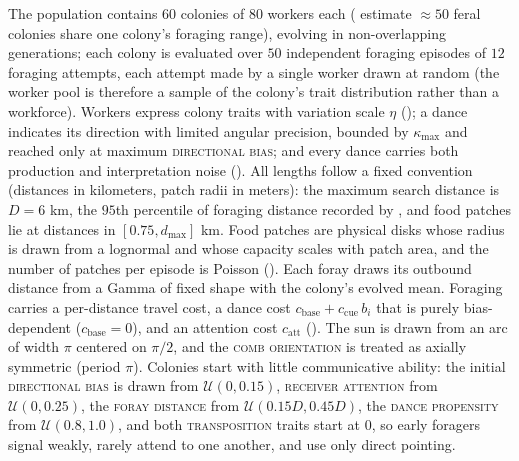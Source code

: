\documentclass[11pt]{article}
\newcommand{\trait}[1]{\textsc{#1}}
\begin{document}
The population contains $60$ colonies of $80$ workers each
(\citealp{visscher1982foraging} estimate $\approx 50$ feral colonies share one
colony's foraging range), evolving in non-overlapping generations; each colony is evaluated over
$50$ independent foraging episodes of $12$ foraging attempts, each attempt made
by a single worker drawn at random (the worker pool is therefore a sample of the
colony's trait distribution rather than a workforce). Workers
express colony traits with variation scale $\eta$ (); a dance
indicates its direction with limited angular precision, bounded by
$\kappa_{\max}$ and reached only at maximum \trait{directional bias}; and every
dance carries both production and interpretation noise ().
All lengths follow a
fixed convention (distances in kilometers, patch radii in meters): the maximum
search distance is $D = 6$ km, the $95$th percentile of foraging distance
recorded by \citet{visscher1982foraging}, and food patches lie at distances in
$[0.75, d_{\max}]$ km. Food patches are physical disks
whose radius is drawn from a lognormal and whose capacity scales with patch area,
and the number of patches per episode is Poisson (). Each foray draws its
outbound distance from a Gamma of fixed shape with the colony's evolved mean.
Foraging carries a per-distance travel cost, a dance cost
$c_{\mathrm{base}} + c_{\mathrm{cue}}\,b_i$ that is purely bias-dependent
($c_{\mathrm{base}} = 0$), and an attention cost $c_{\mathrm{att}}$
(). The sun is drawn from an arc of width $\pi$ centered on
$\pi/2$, and the \trait{comb orientation} is treated as axially symmetric (period $\pi$).
Colonies start with little communicative ability: the initial \trait{directional bias} is
drawn from $\mathcal{U}(0,0.15)$, \trait{receiver attention} from $\mathcal{U}(0,0.25)$,
the \trait{foray distance} from $\mathcal{U}(0.15D, 0.45D)$, the \trait{dance propensity} from
$\mathcal{U}(0.8,1.0)$, and both \trait{transposition} traits start at $0$, so early
foragers signal weakly, rarely attend to one another, and use only direct
pointing.
\end{document}
